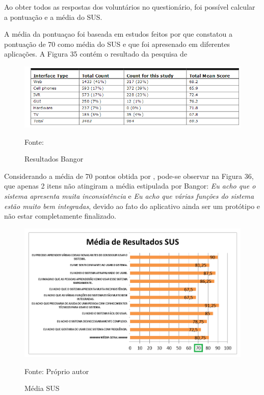 \documentclass[
	12pt,				%
	openany,			%
	oneside,			%
	a4paper,			%
	english,			%
	french,				%
	spanish,			%
	brazil				%
	]{abntex2}
\begin{document}
Ao obter todos as respostas dos voluntários no questionário, foi possível calcular a pontuação e a média do SUS. 

A média da pontuaçao foi baseada em estudos feitos por  que constatou a pontuação de 70 como média do SUS e que foi apresenado em diferentes aplicações. A Figura 35 contém o resultado da pesquisa de 

\begin{figure}[H]
    \centering
\caption{Resultados Bangor}
\includegraphics[width=16cm]{figuras/mediabangor.png}
\par
 Fonte: \cite{BANGOR}
\end{figure}

Considerando a média de 70 pontos obtida por , pode-se observar na Figura 36, que apenas 2 itens não atingiram a média estipulada por Bangor: \textit{Eu acho que o sistema apresenta muita inconsistência} e \textit{Eu acho que várias funções do sistema estão muito bem integradas}, devido ao fato do aplicativo ainda ser um protótipo e não estar completamente finalizado. 

\begin{figure}[H]
    \centering
\caption{Média SUS}
\includegraphics[width=16cm]{figuras/mediasus.png}
\par
 Fonte: Próprio autor
\end{figure}
\end{document}
